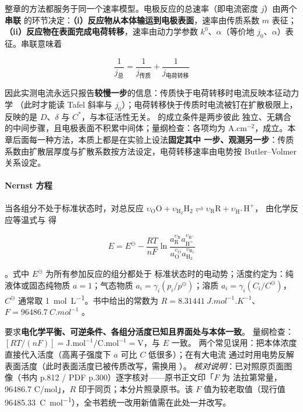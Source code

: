 \begin{principle}
整章的方法都服务于同一个速率模型。电极反应的总速率（即电流密度 $j$）由两个\textbf{串联}
的环节决定：\textbf{（i）反应物从本体输运到电极表面}，速率由传质系数 $m$ 表征；
\textbf{（ii）反应物在表面完成电荷转移}，速率由动力学参数 $k^0$、$\alpha$（等价地
$j_0$、$\alpha$）表征。串联意味着

\begin{equation}
\frac{1}{j_{\text{总}}}=\frac{1}{j_{\text{传质}}}+\frac{1}{j_{\text{电荷转移}}}
\label{eq:series-rate}
\end{equation}

因此实测电流永远只报告\textbf{较慢一步}的信息：传质快于电荷转移时电流反映本征动力学
（此时才能读 Tafel 斜率与 $j_0$）；电荷转移快于传质时电流被钉在扩散极限上，反映的是
$D$、$\delta$ 与 $C^*$，与本征活性无关。 的成立条件是两步彼此
独立、无耦合的中间步骤，且电极表面不积累中间体；量纲检查：各项均为
$\mathrm{A.cm^{-2}}$，成立。本章后面每一种方法，本质上都是在实验上设法\textbf{固定其中
一步、观测另一步}：传质系数由扩散层厚度与扩散系数按方法设定，电荷转移速率由电势按
Butler--Volmer 关系设定。
\end{principle}

\paragraph{Nernst 方程} 当各组分不处于标准状态时，对总反应
$\upsilon_{\mathrm{O}}\mathrm{O}+\upsilon_{\mathrm{H_2}}\mathrm{H_2}
\rightleftharpoons \upsilon_{\mathrm{R}}\mathrm{R}+\upsilon_{\mathrm{H^+}}\mathrm{H^+}$，
由化学反应等温式与  得

\begin{equation}
E=E^\ominus-\frac{RT}{nF}\ln\frac{a_{\mathrm{R}}^{\upsilon_{\mathrm{R}}}
a_{\mathrm{H^+}}^{\upsilon_{\mathrm{H^+}}}}
{a_{\mathrm{O}}^{\upsilon_{\mathrm{O}}}a_{\mathrm{H_2}}^{\upsilon_{\mathrm{H_2}}}}
\label{eq:nernst}
\end{equation}

。式中 $E^\ominus$ 为所有参加反应的组分都处于
标准状态时的电动势；活度约定为：纯液体或固态纯物质 $a=1$；气态物质
$a_i=\gamma_i(p_i/p^\ominus)$；溶质 $a_i=\gamma_i(C_i/C^\ominus)$，$C^\ominus$ 通常取
\qty{1}{mol.L^{-1}}。书中给出的常数为 $R=\qty{8.31441}{J.mol^{-1}.K^{-1}}$、
$F=\qty{96486.7}{C.mol^{-1}}$ 。

\begin{keycond}
 要求\textbf{电化学平衡、可逆条件、各组分活度已知且界面处与本体一致}。
量纲检查：$[RT/(nF)]=\mathrm{J.mol^{-1}}/\mathrm{C.mol^{-1}}=\mathrm{V}$，与 $E$ 一致。
两个常见误用：把本体浓度直接代入活度（高离子强度下 $a$ 可比 $C$ 低很多）；在有大电流
通过时用电势反解表面活度（此时表面活度已被传质改写，需换用 ）。
\emph{核对说明}：已对照原页面图像（书内 p.812 / PDF p.300）逐字核对——原书正文印「$F$ 为
法拉第常量，96486.7 C/mol」，$R$ 印于同页；本分片照录原书。该 $F$ 值为较老取值（现行值
\qty{96485.33}{C.mol^{-1}}），全书若统一改用新值需在此处一并改写。
\end{keycond}

